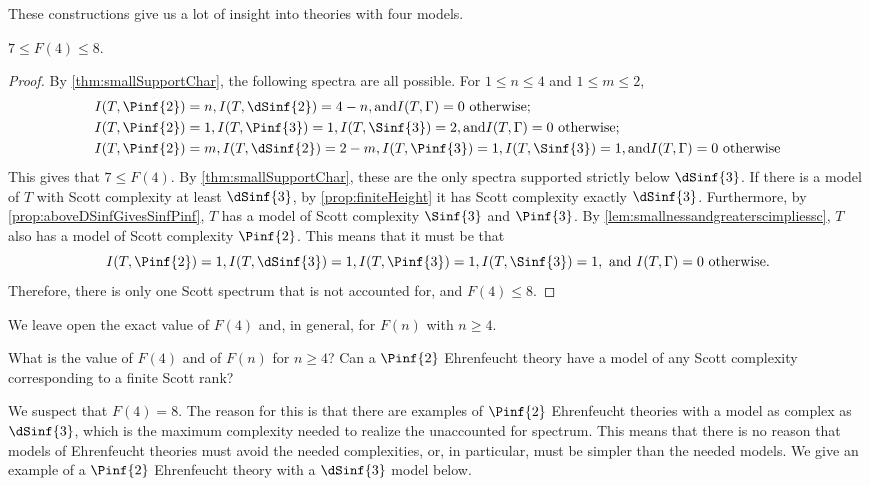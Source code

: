 \documentclass{amsart}
\renewcommand{\-}{\text{-}}
\begin{document}
These constructions give us a lot of insight into theories with four models.
\begin{proposition}
$7\leq F(4)\leq 8$.
\end{proposition}

\begin{proof}
By \cref{thm:smallSupportChar}, the following spectra are all possible.
For $1\leq n\leq 4$ and $1\leq m\leq 2$,
\begin{align*} &I(T,\Pinf{2})=n , I(T,\dSinf{2})=4-n , \text{and}  I(T,\Gamma)=0 \text{ otherwise;}\\
 &I(T,\Pinf{2})=1 , I(T,\Pinf{3})=1 , I(T,\Sinf{3})=2 , \text{and} I(T,\Gamma)=0 \text{ otherwise;}\\
 &I(T,\Pinf{2})=m ,  I(T,\dSinf{2})=2-m ,  I(T,\Pinf{3})=1 , I(T,\Sinf{3})=1 , \text{and} I(T,\Gamma)=0 \text{ otherwise}\end{align*}
This gives that $7\leq F(4)$.
By \cref{thm:smallSupportChar}, these are the only spectra supported strictly below $\dSinf{3}$.
If there is a model of $T$ with Scott complexity at least $\dSinf{3}$, by \cref{prop:finiteHeight} it has Scott complexity exactly $\dSinf{3}$.
Furthermore, by \cref{prop:aboveDSinfGivesSinfPinf}, $T$ has a model of Scott complexity $\Sinf{3}$ and $\Pinf{3}$.
By \cref{lem:smallnessandgreaterscimpliessc}, $T$ also has a model of Scott complexity $\Pinf{2}$.
This means that it must be that 
\[ I(T,\Pinf{2})=1 ,  I(T,\dSinf{3})=1 ,  I(T,\Pinf{3})=1 , I(T,\Sinf{3})=1 ,\text{ and } I(T,\Gamma)=0 \text{ otherwise.}\]
Therefore, there is only one Scott spectrum that is not accounted for, and $F(4)\leq 8$.
\end{proof}

We leave open the exact value of $F(4)$ and, in general, for $F(n)$ with $n\geq 4$.

\begin{question}
What is the value of $F(4)$ and of $F(n)$ for $n\geq 4$? Can a $\Pinf{2}$ Ehrenfeucht theory have a model of any Scott complexity corresponding to a finite Scott rank?
\end{question}

We suspect that $F(4)=8$.
The reason for this is that there are examples of $\Pinf{2}$ Ehrenfeucht theories with a model as complex as $\dSinf{3}$, which is the maximum complexity needed to realize the unaccounted for spectrum.
This means that there is no reason that models of Ehrenfeucht theories must avoid the needed complexities, or, in particular, must be simpler than the needed models.
We give an example of a $\Pinf{2}$ Ehrenfeucht theory with a $\dSinf{3}$ model below.
\end{document}
